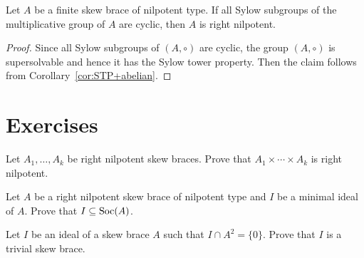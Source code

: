 \begin{corollary}
    Let $A$ be a finite skew brace of nilpotent type. 
    If all Sylow subgroups of the multiplicative
    group of $A$ are cyclic, then $A$ is right nilpotent.
\end{corollary}

\begin{proof}
    Since all Sylow subgroups of $(A,\circ)$ are cyclic, the group $(A,\circ)$ is supersolvable and hence
    it has the Sylow tower property. Then the claim follows from Corollary~\ref{cor:STP+abelian}.
\end{proof}


\section*{Exercises}

\begin{prob}
     Let $A_1,\dots,A_k$ be right nilpotent skew braces. Prove that 
     $A_1\times\cdots\times A_k$ is right nilpotent.
\end{prob}

\begin{prob}
    Let $A$ be a right nilpotent skew brace of nilpotent type and $I$ be a
    minimal ideal of $A$. Prove that $I\subseteq\operatorname{Soc}(A)$.
\end{prob}

\begin{prob}
    Let $I$ be an ideal of a skew brace $A$ such that $I\cap A^2=\{0\}$. Prove that $I$
    is a trivial skew brace.
\end{prob}

\begin{prob}
\end{prob}


